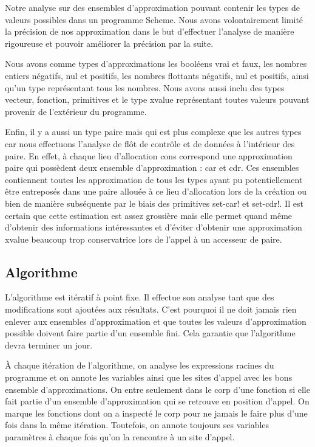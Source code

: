Notre analyse sur des ensembles d'approximation pouvant contenir les
types de valeurs possibles dans un programme Scheme. Nous avons
volontairement limité la précision de nos approximation dans le but
d'effectuer l'analyse de manière rigoureuse et pouvoir améliorer la
précision par la suite.

Nous avons comme types d'approximations les booléens vrai et faux, les
nombres entiers négatifs, nul et positifs, les nombres flottants
négatifs, nul et positifs, ainsi qu'un type représentant tous les
nombres. Nous avons aussi inclu des types vecteur, fonction,
primitives et le type xvalue représentant toutes valeurs pouvant
provenir de l'extérieur du programme.

Enfin, il y a aussi un type paire mais qui est plus complexe que les
autres types car nous effectuons l'analyse de flôt de contrôle et de
données à l'intérieur des paire.  En effet, à chaque lieu d'allocation
cons correspond une approximation paire qui possèdent deux ensemble
d'approximation : car et cdr. Ces ensembles contiennent toutes les
approximation de tous les types ayant pu potentiellement être
entreposés dans une paire allouée à ce lieu d'allocation lors de la
création ou bien de manière subséquente par le biais des primitives
set-car! et set-cdr!. Il est certain que cette estimation est assez
grossière mais elle permet quand même d'obtenir des informations
intéressantes et d'éviter d'obtenir une approximation xvalue beaucoup
trop conservatrice lors de l'appel à un accesseur de paire.

\subsection{Algorithme}

L'algorithme est itératif à point fixe. Il effectue son analyse tant
que des modifications sont ajoutées aux résultats. C'est pourquoi il
ne doit jamais rien enlever aux ensembles d'approximation et que
toutes les valeurs d'approximation possible doivent faire partie d'un
ensemble fini. Cela garantie que l'algorithme devra terminer un jour.

À chaque itération de l'algorithme, on analyse les expressions racines
du programme et on annote les variables ainsi que les sites d'appel
avec les bons ensemble d'approximations. On entre seulement dans le
corp d'une fonction si elle fait partie d'un ensemble d'approximation
qui se retrouve en position d'appel. On marque les fonctions dont on a
inspecté le corp pour ne jamais le faire plus d'une fois dans la même
itération. Toutefois, on annote toujours ses variables paramètres à
chaque fois qu'on la rencontre à un site d'appel.

